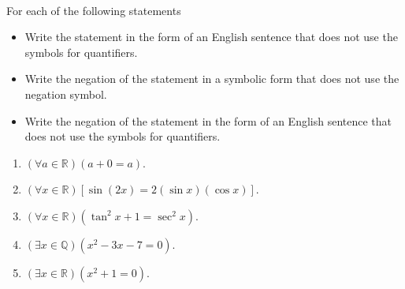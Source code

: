 \hbreak
%
\begin{prog}\label{pr:negating} \hfill \\
For each of the following statements
\renewcommand{\theenumi}{\alph{enumi}}
\begin{itemize}
  \item Write the statement in the form of an English sentence that does not use the symbols for quantifiers.
  \item Write the negation of the statement in a symbolic form that does not use the negation symbol.
  \item Write the negation of the statement in the form of an English sentence that does not use the symbols for quantifiers.
\end{itemize}

\begin{enumerate}
  \item $\left( \forall a \in \mathbb{R}\right) \left( a + 0 = a \right)$.
  \item $\left( \forall x \in \mathbb{R} \right) \left[ \sin ( {2x} ) = 2 ( {\sin x} )( {\cos x} ) \right]$.
  \item $\left( \forall x \in \mathbb{R} \right) \left( \tan ^2 x + 1 = \sec ^2 x \right)$.
  \item $\left( \exists x \in \mathbb{Q} \right) \left( x^2  - 3x - 7 = 0 \right)$.
  \item $\left( \exists x \in \mathbb{R} \right) \left( x^2  + 1 = 0 \right)$.
\end{enumerate}
\end{prog}
%
%
\hbreak


\endinput
